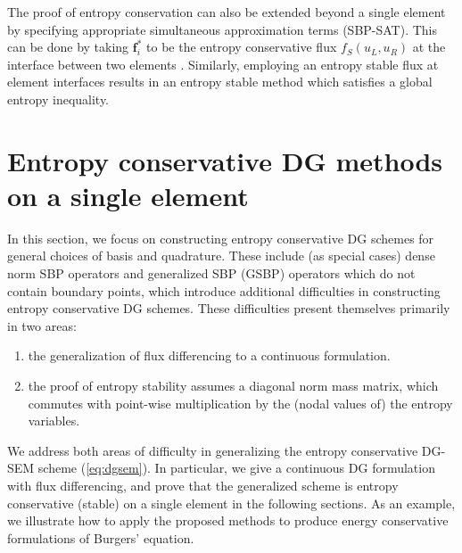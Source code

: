\documentclass[preprint,10pt]{article}
\theoremstyle{definition}
\theoremstyle{lemma}
\theoremstyle{theorem}
\theoremstyle{assumption}
\begin{document}
The proof of entropy conservation can also be extended beyond a single element by specifying appropriate simultaneous approximation terms (SBP-SAT).  This can be done by taking $\bm{f}_i^*$ to be the entropy conservative flux $f_S(u_L,u_R)$ at the interface between two elements \cite{carpenter2014entropy, gassner2017br1, chen2017entropy}.  Similarly, employing an entropy stable flux at element interfaces results in an entropy stable method which satisfies a global entropy inequality.  


\section{Entropy conservative DG methods on a single element}
\label{sec:ecdg}

In this section, we focus on constructing entropy conservative DG schemes for general choices of basis and quadrature.  These include (as special cases) dense norm SBP operators and generalized SBP (GSBP) operators which do not contain boundary points, which introduce additional difficulties in constructing entropy conservative DG schemes.  These difficulties present themselves primarily in two areas: 
\begin{enumerate}
\item the generalization of flux differencing to a continuous formulation.  
\item the proof of entropy stability assumes a diagonal norm mass matrix, which commutes with point-wise multiplication by the (nodal values of) the entropy variables.  
\end{enumerate}

We address both areas of difficulty in generalizing the entropy conservative DG-SEM scheme (\ref{eq:dgsem}).  In particular, we give a continuous DG formulation with flux differencing, and prove that the generalized scheme is entropy conservative (stable) on a single element in the following sections.  As an example, we illustrate how to apply the proposed methods to produce energy conservative formulations of Burgers' equation.  


\end{document}
